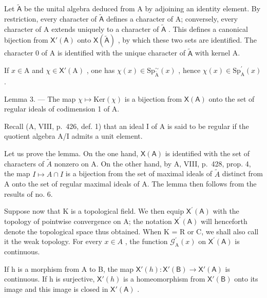 Let \(\widetilde{\mathsf{A}}\) be the unital algebra deduced from A by adjoining an identity element. By restriction, every character of \(\widetilde{\mathsf{A}}\) defines a character of A; conversely, every character of A extends uniquely to a character of \(\widetilde{\mathsf{A}}\) . This defines a canonical bijection from \(\mathsf{X}'(\mathsf{A})\) onto \(\mathsf{X}(\widetilde{\mathsf{A}})\) , by which these two sets are identified. The character 0 of A is identified with the unique character of \(\widetilde{\mathsf{A}}\) with kernel A.

If \(x\in \mathrm{A}\) and \(\chi \in \mathsf{X}'(\mathrm{A})\) , one has \(\chi (x)\in \mathrm{Sp}_{\widetilde{\mathrm{A}}}^{\sim}(x)\) , hence \(\chi (x)\in \mathrm{Sp}_{\mathrm{A}}^{\prime}(x)\) .

Lemma 3. --- The map \(\chi \mapsto \mathrm{Ker}(\chi)\) is a bijection from \(\mathsf{X}(\mathsf{A})\) onto the set of regular ideals of codimension 1 of A.

Recall (A, VIII, p.~426, def. 1) that an ideal I of A is said to be regular if the quotient algebra A/I admits a unit element.

Let us prove the lemma. On the one hand, \(\mathsf{X}(\mathsf{A})\) is identified with the set of characters of \(\widetilde{A}\) nonzero on A. On the other hand, by A, VIII, p.~428, prop. 4, the map \(I \mapsto A \cap I\) is a bijection from the set of maximal ideals of \(\widetilde{A}\) distinct from A onto the set of regular maximal ideals of A. The lemma then follows from the results of no. 6.

Suppose now that K is a topological field. We then equip \(\mathsf{X}^{\prime}(\mathsf{A})\) with the topology of pointwise convergence on A; the notation \(\mathsf{X}^{\prime}(\mathsf{A})\) will henceforth denote the topological space thus obtained. When K = R or C, we shall also call it the weak topology. For every \(x \in A\) , the function \(\mathcal{G}_{\mathrm{A}}^{\prime}(x)\) on \(\mathsf{X}^{\prime}(\mathsf{A})\) is continuous.

If h is a morphism from A to B, the map \(\mathsf{X}'(h)\colon\mathsf{X}'(\mathsf{B})\to\mathsf{X}'(\mathsf{A})\) is continuous. If h is surjective, \(\mathsf{X}'(h)\) is a homeomorphism from \(\mathsf{X}'(\mathsf{B})\) onto its image and this image is closed in \(\mathsf{X}'(\mathsf{A})\) .

